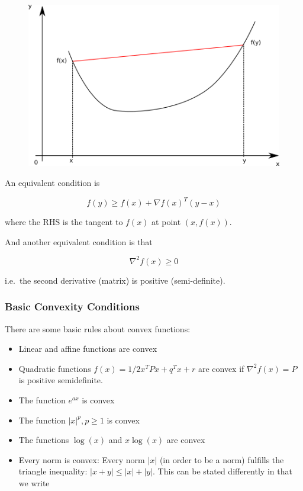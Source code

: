 \begin{figure}[H]
\includegraphics[scale=0.7]{images/convex_opt_02.png}
\end{figure}

An equivalent condition is

\[
f(y) \geq f(x) + \nabla f(x)^T (y-x)
\]

where the RHS is the tangent to $f(x)$ at point $(x, f(x))$.

And another equivalent condition is that

\[
\nabla^2 f(x) \geq 0
\]

i.e.~the second derivative (matrix) is positive (semi-definite).

\subsubsection{Basic Convexity Conditions}

There are some basic rules about convex functions:

\begin{itemize}
\item
  Linear and affine functions are convex
\item
  Quadratic functions $f(x) = 1/2 x^T P x + q^T x + r$ are convex if $\nabla^2 f(x) = P $ is positive semidefinite.
\item
  The function $e^{a x}$ is convex
\item
  The function $|x|^p, p \geq 1$ is convex
\item
  The functions $\log(x)$ and $x \log(x)$ are convex
\item
  Every norm is convex: Every norm $|x|$ (in order to
  be a norm) fulfills the triangle inequality:
  $|x+y| \leq |x| + |y|$. This can be stated differently in that we write
\end{itemize}

